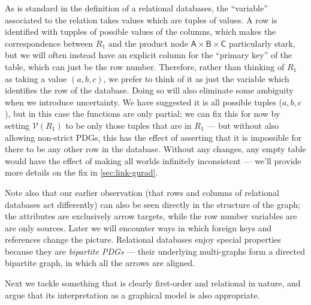 \documentclass{article}
\theoremstyle{plain}
\theoremstyle{definition}
\theoremstyle{remark}
\newcommand{\V}{\mathcal V}
\newcommand{\var}[1]{\mathsf{#1}}
\begin{document}
\begin{example}
    As is standard in the definition of a relational databases, the ``variable'' associated to the relation takes values which are tuples of values. A row is identified with tupples of possible values of the columns, which makes the correspondence between $R_1$ and the product node $\var{A \times B \times C}$ particularly stark, but we will often instead have an explicit column for the ``primary key'' of the table, which can just be the row number. Therefore, rather than thinking of $R_1$ as taking a value $(a,b,c)$, we prefer to think of it as just the variable which identifies the row of the database. Doing so will also eliminate some ambiguity when we introduce uncertainty.
    We have suggested it is all possible tuples ($a,b,c$), but in this case the functions are only partial; we can fix this for now by setting $\V(R_1)$ to be only those tuples that are in $R_1$ --- but without also allowing non-strict PDGs, this has the effect of asserting that it is impossible for there to be any other row in the database. Without any changes, any empty table would have the effect of making all worlds infinitely inconsistent --- we'll provide more details on the fix in \cref{sec:link-gurad}.
        
    Note also that our earlier observation (that rows and columns of relational databases act differently) can also be seen directly in the structure of the graph; the attributes are exclusively arrow targets, while the row number variables are are only sources. Later we will encounter ways in which foreign keys and references change the picture. Relational databases enjoy special properties because they are \emph{bipartite PDGs} --- their underlying multi-graphs form a directed bipartite graph, in which all the arrows are aligned.
    
    

\end{example}

Next we tackle something that is clearly first-order and relational in nature, and argue that its interpretation as a graphical model is also appropriate.
\end{document}

